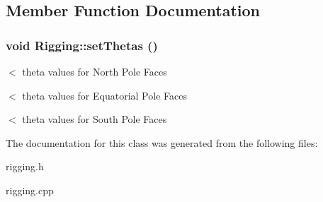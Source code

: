 \subsection{Member Function Documentation}
\hypertarget{classRigging_aff45671b55d4d94d140935b8998236b7}{
\subsubsection[{setThetas}]{\setlength{\rightskip}{0pt plus 5cm}void Rigging::setThetas ()}}
\label{classRigging_aff45671b55d4d94d140935b8998236b7}


$<$ theta values for North Pole Faces

$<$ theta values for Equatorial Pole Faces

$<$ theta values for South Pole Faces 

The documentation for this class was generated from the following files:\begin{DoxyCompactItemize}
\item 
rigging.h\item 
rigging.cpp\end{DoxyCompactItemize}
